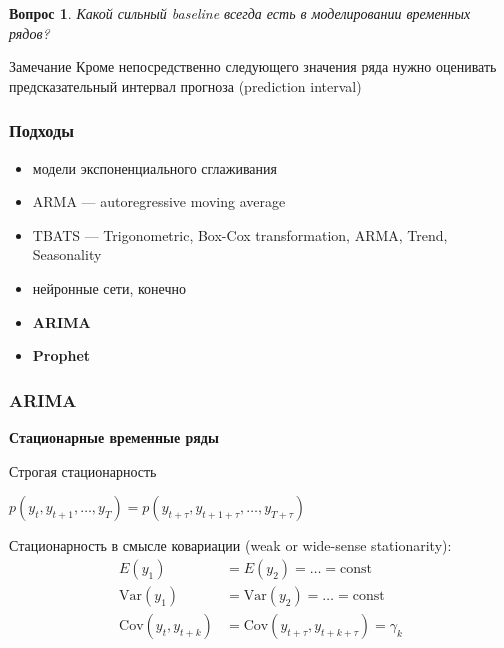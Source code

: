 \documentclass[fullscreen=true, bookmarks=true, hyperref={pdfencoding=unicode}]{beamer}
\newtheorem*{question}{Вопрос}
\begin{document}
\begin{frame}
  \begin{question}
    Какой сильный baseline всегда есть в моделировании временных рядов?
  \end{question}
  \pause
  \vspace{2cm}
  \begin{block}{Замечание}
  Кроме непосредственно следующего значения ряда нужно оценивать предсказательный интервал прогноза (prediction interval)
\end{block}
\end{frame}


\begin{frame}
  \frametitle{Подходы}

  \begin{itemize}
    \item модели экспоненциального сглаживания
    \item ARMA — autoregressive moving average
    \item TBATS — Trigonometric, Box-Cox transformation, ARMA, Trend, Seasonality
    \item нейронные сети, конечно
    \item {\bf ARIMA}
    \item {\bf Prophet}
  \end{itemize}
\end{frame}

\begin{frame}
  \frametitle{ARIMA}

  {\bf Стационарные временные ряды}

  \vspace{1cm}
  Строгая стационарность

  $ p(y_t, y_{t+1}, \dots , y_T) = p(y_{t+\tau}, y_{t+1+\tau},\dots, y_{T+\tau}) $

  \vspace{1cm}
  Стационарность в смысле ковариации (weak or wide-sense stationarity):
  \begin{align*}
    E(y_1) &= E(y_2) = \dots = \text{const} \\
    \text{Var}(y_1) &= \text{Var}(y_2) = \dots = \text{const} \\
      \text{Cov}(y_t, y_{t+k}) &= \text{Cov}(y_{t+\tau}, y_{t+k+\tau}) = \gamma_k
  \end{align*}
\end{frame}
\end{document}
